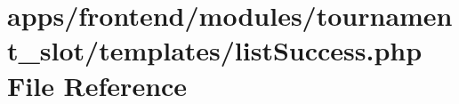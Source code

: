 \hypertarget{frontend_2modules_2tournament__slot_2templates_2list_success_8php}{\section{apps/frontend/modules/tournament\-\_\-slot/templates/list\-Success.php File Reference}
\label{frontend_2modules_2tournament__slot_2templates_2list_success_8php}
}
